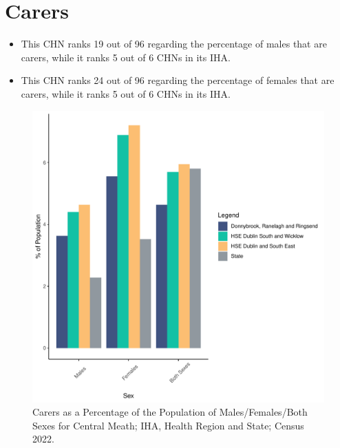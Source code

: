 \documentclass{article}
\begin{document}
\section{Carers}\label{sect:Carers}
\begin{itemize}
\item This CHN ranks  19 out of 96 regarding the percentage of males that are carers, while it ranks   5 out of 6 CHNs in its IHA.
\item This CHN ranks  24 out of 96 regarding the percentage of females that are carers, while it ranks   5 out of 6 CHNs in its IHA.
\end{itemize}
\begin{figure}[H]
	\centering
	\includegraphics[width = 150mm]{../figures/CareED.pdf}
	\caption{Carers as a Percentage of the Population of Males/Females/Both Sexes for Central Meath; IHA, Health Region and State; Census 2022.}
	\label{fig:2ae19629-1a6a-13a3-e055-000000000001}
	\end{figure}
\end{document}

